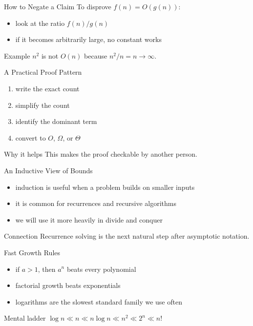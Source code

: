 \documentclass[aspectratio=169,xcolor=dvipsnames]{beamer}
\begin{document}
\begin{frame}{How to Negate a Claim}
  To disprove $f(n)=O(g(n))$:
  \begin{itemize}
    \item look at the ratio $f(n)/g(n)$
    \item if it becomes arbitrarily large, no constant works
  \end{itemize}
  \begin{exampleblock}{Example}
    $n^2$ is not $O(n)$ because $n^2/n = n \to \infty$.
  \end{exampleblock}
\end{frame}

\begin{frame}{A Practical Proof Pattern}
  \begin{enumerate}
    \item write the exact count
    \item simplify the count
    \item identify the dominant term
    \item convert to $O$, $\Omega$, or $\Theta$
  \end{enumerate}
  \begin{block}{Why it helps}
    This makes the proof checkable by another person.
  \end{block}
\end{frame}

\begin{frame}{An Inductive View of Bounds}
  \begin{itemize}
    \item induction is useful when a problem builds on smaller inputs
    \item it is common for recurrences and recursive algorithms
    \item we will use it more heavily in divide and conquer
  \end{itemize}
  \begin{exampleblock}{Connection}
    Recurrence solving is the next natural step after asymptotic notation.
  \end{exampleblock}
\end{frame}

\begin{frame}{Fast Growth Rules}
  \begin{itemize}
    \item if $a > 1$, then $a^n$ beats every polynomial
    \item factorial growth beats exponentials
    \item logarithms are the slowest standard family we use often
  \end{itemize}
  \begin{block}{Mental ladder}
    $\log n \ll n \ll n \log n \ll n^2 \ll 2^n \ll n!$
  \end{block}
\end{frame}
\end{document}
